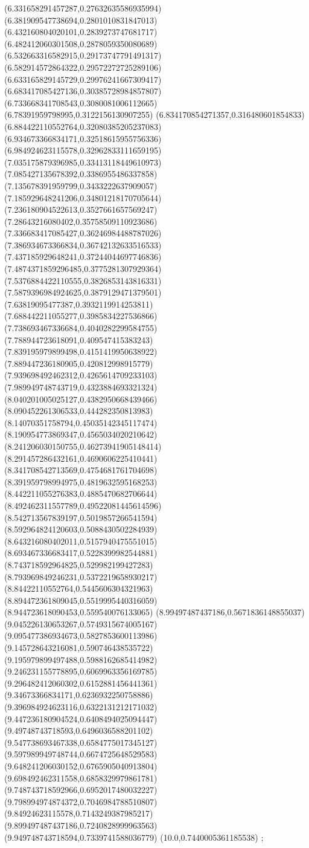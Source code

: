 {(6.331658291457287,0.27632635586935994)
(6.381909547738694,0.2801010831847013)
(6.432160804020101,0.2839273747681717)
(6.482412060301508,0.2878059350080689)
(6.532663316582915,0.29173747791491317)
(6.582914572864322,0.29572272725289106)
(6.633165829145729,0.29976241667309417)
(6.683417085427136,0.30385728984857807)
(6.733668341708543,0.3080081006112665)
(6.78391959798995,0.3122156130907255)
(6.834170854271357,0.316480601854833)
(6.884422110552764,0.32080385205237083)
(6.934673366834171,0.32518615955756336)
(6.984924623115578,0.32962833111659195)
(7.035175879396985,0.33413118449610973)
(7.085427135678392,0.3386955486337858)
(7.135678391959799,0.3433222637909057)
(7.185929648241206,0.34801218170705644)
(7.236180904522613,0.3527661657569247)
(7.28643216080402,0.35758509110923686)
(7.336683417085427,0.36246984488787026)
(7.386934673366834,0.36742132633516533)
(7.437185929648241,0.37244044697746836)
(7.4874371859296485,0.3775281307929364)
(7.5376884422110555,0.3826853143816331)
(7.5879396984924625,0.3879129471379501)
(7.63819095477387,0.3932119914253811)
(7.688442211055277,0.3985834227536866)
(7.738693467336684,0.4040282299584755)
(7.788944723618091,0.409547415383243)
(7.839195979899498,0.4151419950638922)
(7.889447236180905,0.420812998915779)
(7.939698492462312,0.4265614709233103)
(7.989949748743719,0.4323884693321324)
(8.040201005025127,0.4382950668439466)
(8.090452261306533,0.444282350813983)
(8.14070351758794,0.45035142345117474)
(8.190954773869347,0.4565034020210642)
(8.241206030150755,0.46273941905148414)
(8.291457286432161,0.4690606225410441)
(8.341708542713569,0.4754681761704698)
(8.391959798994975,0.4819632595168253)
(8.442211055276383,0.4885470682706644)
(8.492462311557789,0.49522081445614596)
(8.542713567839197,0.5019857266541594)
(8.592964824120603,0.5088430502284939)
(8.643216080402011,0.5157940475551015)
(8.693467336683417,0.5228399982544881)
(8.743718592964825,0.529982199427283)
(8.793969849246231,0.5372219658930217)
(8.84422110552764,0.5445606304321963)
(8.894472361809045,0.5519995440316059)
(8.944723618090453,0.559540076133065)
(8.99497487437186,0.5671836148855037)
(9.045226130653267,0.5749315674005167)
(9.095477386934673,0.5827853600113986)
(9.145728643216081,0.590746438535722)
(9.195979899497488,0.5988162685414982)
(9.246231155778895,0.6069963356169785)
(9.296482412060302,0.6152881456441361)
(9.34673366834171,0.6236932250758886)
(9.396984924623116,0.6322131212171032)
(9.447236180904524,0.6408494025094447)
(9.49748743718593,0.6496036588201102)
(9.547738693467338,0.6584775017345127)
(9.597989949748744,0.6674725648529583)
(9.648241206030152,0.6765905040913804)
(9.698492462311558,0.6858329979861781)
(9.748743718592966,0.6952017480032227)
(9.798994974874372,0.7046984788510807)
(9.84924623115578,0.7143249387985217)
(9.899497487437186,0.7240828999963563)
(9.949748743718594,0.7339741588036779)
(10.0,0.7440005361185538)
};
